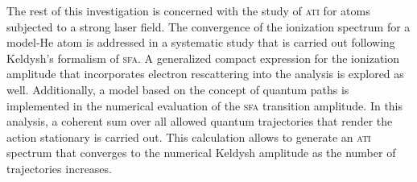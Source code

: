 The rest of this investigation is concerned with the study of
\textsc{ati} for atoms subjected to a strong laser field. The
convergence of the ionization spectrum for a model-He atom is
addressed in a systematic study that is carried out following
Keldysh's formalism of \textsc{sfa}. A generalized compact expression
for the ionization amplitude that incorporates electron rescattering
into the analysis is explored as well. Additionally, a model based on
the concept of quantum paths is implemented in the numerical
evaluation of the \textsc{sfa} transition amplitude. In this analysis,
a coherent sum over all allowed quantum trajectories that render the
action stationary is carried out. This calculation allows to generate
an \textsc{ati} spectrum that converges to the numerical Keldysh
amplitude as the number of trajectories increases.
































































